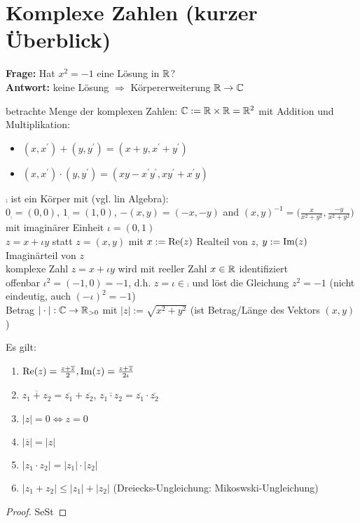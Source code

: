 \section{Komplexe Zahlen (kurzer Überblick)}

\textbf{Frage:} Hat $x^2 = -1$  eine Lösung in $\mathbb{R}$? \\
\textbf{Antwort:} keine Lösung $\Rightarrow$ Körpererweiterung $\mathbb{R} \to \mathbb{C}$

\begin{definition}
	betrachte Menge der komplexen Zahlen: $\mathbb{C} := \mathbb{R} \times \mathbb{R} = \mathbb{R}^2$ mit Addition und Multiplikation:
	\begin{itemize}
		\item $(x,x^{'}) + (y,y^{'}) = (x+y, x^{'} + y^{'})$
		\item $(x,x^{'}) \cdot (y,y^{'}) = (xy - x^{'}y^{'}, xy^{'}+x^{'}y)$
	\end{itemize}
\end{definition}

$\comp$ ist ein Körper mit (vgl. lin Algebra):\\
$0_{\comp} = (0,0)$,  $1_{\comp} = (1,0)$, $-(x,y) = (-x,-y)$ and $(x,y)^{-1} = \bigg(\frac{x}{x^2+y^2},\frac{-y}{x^2+y^2}\bigg)$\\
mit imaginärer Einheit $\iota=(0,1)$\\
$z=x+\iota y$ statt $z=(x,y)$ mit $x:=\operatorname{Re}(z)$ Realteil von $z$, $y:= \operatorname{Im}(z)$ Imaginärteil von $z$\\
komplexe Zahl $z=x + \iota y$ wird mit reeller Zahl $x \in \mathbb{R}$ identifiziert\\
offenbar $\iota^2=(-1,0)=-1$, d.h. $z=\iota \in \comp$ und löst die Gleichung $z^2=-1$ (nicht eindeutig, auch $(-\iota)^2 = -1$)\\
Betrag $|\cdot|: \mathbb{C} \to \mathbb{R}_{> 0}$ mit $|z|:= \sqrt{x^2+y^2}$ (ist Betrag/Länge des Vektors $(x,y)$)\\

\begin{proposition}
	Es gilt:
	\begin{enumerate}[label={\alph*)}]
		\item $\operatorname{Re}(z) = \frac{z+\overline{z}}{2}, \operatorname{Im}(z) = \frac{z+\overline{z}}{2\iota}$
		\item $\overline{z_1 + z_2} = \overline{z_1} + \overline{z_2}$, $\overline{z_1 \cdot z_2} = \overline{z_1} \cdot \overline{z_2}$
		\item $|z| = 0 \iff z=0$
		\item $|\overline{z}| = |z|$
		\item $|z_1 \cdot z_2| = |z_1| \cdot |z_2|$
		\item $|z_1 + z_2| \leq |z_1| + |z_2|$ (Dreiecks-Ungleichung: Mikoswski-Ungleichung)
	\end{enumerate}
\end{proposition}
\begin{proof}
	SeSt \QEDA
\end{proof}